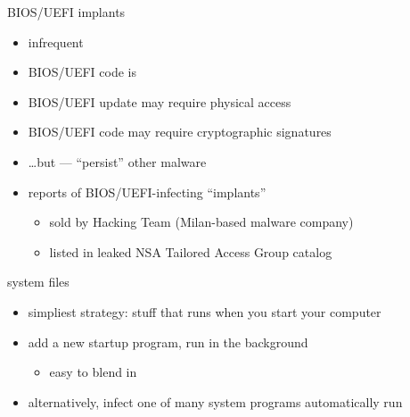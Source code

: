 
\begin{frame}{BIOS/UEFI implants}
    \begin{itemize}
    \item infrequent
    \item BIOS/UEFI code is 
    \item BIOS/UEFI update may require physical access
    \item BIOS/UEFI code may require cryptographic signatures
    \item \ldots but  --- ``persist'' other malware
    \item reports of BIOS/UEFI-infecting ``implants''
        \begin{itemize}
        \item sold by Hacking Team (Milan-based malware company) 
        \item listed in leaked NSA Tailored Access Group catalog
        \end{itemize}
    \end{itemize}
\end{frame}


\begin{frame}{system files}
    \begin{itemize}
    \item simpliest strategy: stuff that runs when you start your computer
    \item add a new startup program, run in the background
        \begin{itemize}
        \item easy to blend in
        \end{itemize}
    \vspace{.5cm}
    \item alternatively, infect one of many system programs automatically run
    \end{itemize}

\end{frame}

